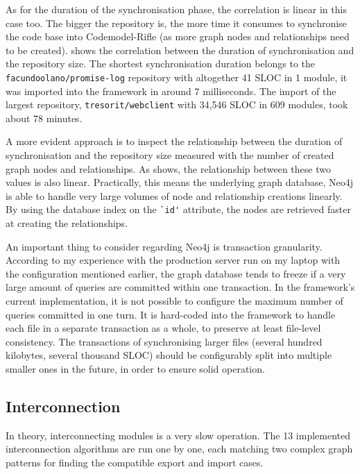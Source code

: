 As for the duration of the synchronisation phase, the correlation is linear in this case too. The bigger the repository is, the more time it consumes to synchronise the code base into Codemodel-Rifle (as more graph nodes and relationships need to be created).  shows the correlation between the duration of synchronisation and the repository size. The shortest synchronisation duration belongs to the \lstinline{facundoolano/promise-log} repository with altogether 41 SLOC in 1 module, it was imported into the framework in around 7 milliseconds. The import of the largest repository, \lstinline{tresorit/webclient} with 34,546 SLOC in 609 modules, took about 78 minutes.

A more evident approach is to inspect the relationship between the duration of synchronisation and the repository size measured with the number of created graph nodes and relationships. As  shows, the relationship between these two values is also linear. Practically, this means the underlying graph database, Neo4j is able to handle very large volumes of node and relationship creations linearly. By using the database index on the \lstinline{`id'} attribute, the nodes are retrieved faster at creating the relationships.

An important thing to consider regarding Neo4j is transaction granularity. According to my experience with the production server run on my laptop with the configuration mentioned earlier, the graph database tends to freeze if a very large amount of queries are committed within one transaction. In the framework's current implementation, it is not possible to configure the maximum number of queries committed in one turn. It is hard-coded into the framework to handle each file in a separate transaction as a whole, to preserve at least file-level consistency. The transactions of synchronising larger files (several hundred kilobytes, several thousand SLOC) should be configurably split into multiple smaller ones in the future, in order to ensure solid operation.


\subsection{Interconnection}

In theory, interconnecting \es modules is a very slow operation. The 13 implemented interconnection algorithms are run one by one, each matching two complex graph patterns for finding the compatible export and import cases.

